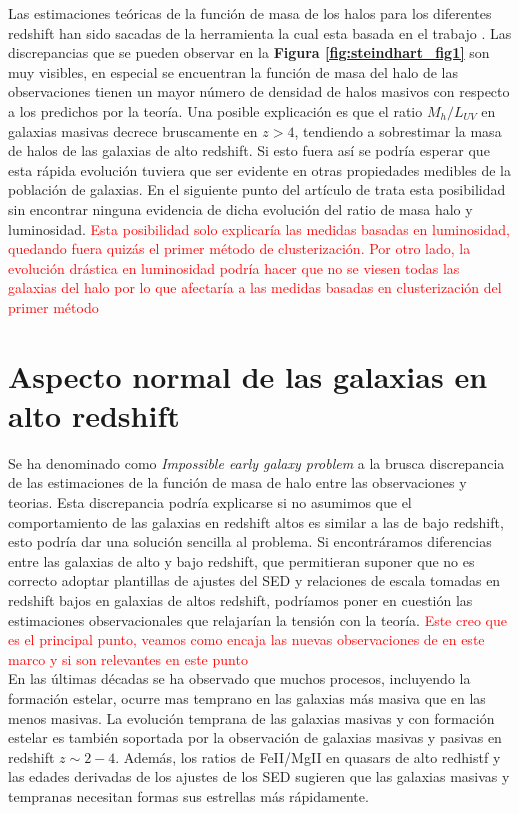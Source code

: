 \documentclass{article}
\begin{document}
Las estimaciones teóricas de la función de masa de los halos para los diferentes redshift han sido sacadas de la herramienta \cite{murray2013hmfcalc} la cual esta basada en el trabajo \cite{sheth2001ellipsoidal}. Las discrepancias que se pueden observar en la \textbf{Figura \ref{fig:steindhart_fig1}} son muy visibles, en especial se encuentran la función de masa del halo de las observaciones tienen un mayor número de densidad de halos masivos con respecto a los predichos por la teoría. Una posible explicación es que el ratio $M_h/L_{UV}$ en galaxias masivas decrece bruscamente en $z>4$, tendiendo a sobrestimar la masa de halos de las galaxias de alto redshift. Si esto fuera así se podría esperar que esta rápida evolución tuviera que ser evidente en otras propiedades medibles de la población de galaxias. En el siguiente punto del artículo de \cite{steinhardt2016impossibly} trata esta posibilidad sin encontrar ninguna evidencia de dicha evolución del ratio de masa halo y luminosidad. \textcolor{red}{Esta posibilidad solo explicaría las medidas basadas en luminosidad, quedando fuera quizás el primer método de clusterización. Por otro lado, la evolución drástica en luminosidad podría hacer que no se viesen todas las galaxias del halo \citep{wang2019dominant} por lo que afectaría a las medidas basadas en clusterización del primer método}

\section*{Aspecto normal de las galaxias en alto redshift}
Se ha denominado como \textit{Impossible early galaxy problem} a la brusca discrepancia de las estimaciones de la función de masa de halo entre las observaciones y teorias. Esta discrepancia podría explicarse si no asumimos que el comportamiento de las galaxias en redshift altos es similar a las de bajo redshift, esto podría dar una solución sencilla al problema. Si encontráramos diferencias entre las galaxias de alto y bajo redshift, que permitieran suponer que no es correcto adoptar plantillas de ajustes del SED y relaciones de escala tomadas en redshift bajos en galaxias de altos redshift, podríamos poner en cuestión las estimaciones observacionales que relajarían la tensión con la teoría. \textcolor{red}{Este creo que es el principal punto, veamos como encaja las nuevas observaciones de \cite{wang2019dominant} en este marco y si son relevantes en este punto}\\

En las últimas décadas se ha observado que muchos procesos, incluyendo la formación estelar, ocurre mas temprano en las galaxias más masiva que en las menos masivas. La evolución temprana de las galaxias masivas y con formación estelar es también soportada por la observación de galaxias masivas y pasivas en redshift $z\sim 2-4$. Además, los ratios de FeII/MgII en quasars de alto redhistf y las edades derivadas de los ajustes de los SED sugieren que las galaxias masivas y tempranas necesitan formas sus estrellas más rápidamente.\\
\end{document}

